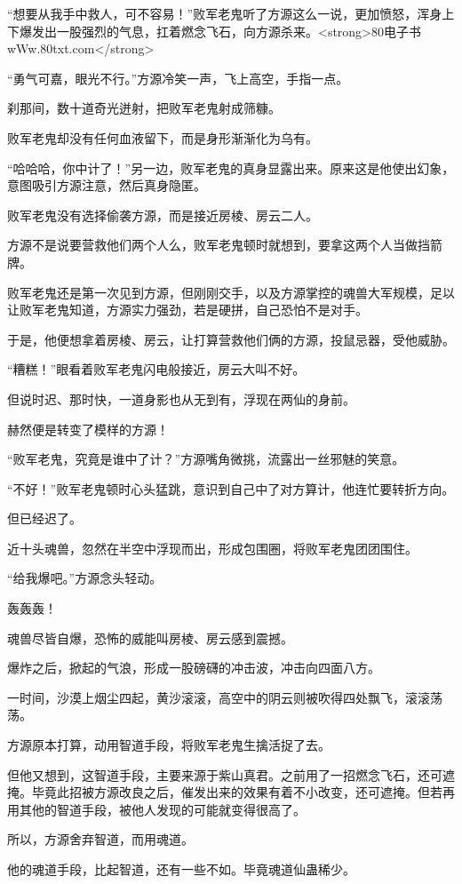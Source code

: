 \begin{this_body}
“想要从我手中救人，可不容易！”败军老鬼听了方源这么一说，更加愤怒，浑身上下爆发出一股强烈的气息，扛着燃念飞石，向方源杀来。<strong>80电子书wWw.80txt.com</strong>

“勇气可嘉，眼光不行。”方源冷笑一声，飞上高空，手指一点。

刹那间，数十道奇光迸射，把败军老鬼射成筛糠。

败军老鬼却没有任何血液留下，而是身形渐渐化为乌有。

“哈哈哈，你中计了！”另一边，败军老鬼的真身显露出来。原来这是他使出幻象，意图吸引方源注意，然后真身隐匿。

败军老鬼没有选择偷袭方源，而是接近房棱、房云二人。

方源不是说要营救他们两个人么，败军老鬼顿时就想到，要拿这两个人当做挡箭牌。

败军老鬼还是第一次见到方源，但刚刚交手，以及方源掌控的魂兽大军规模，足以让败军老鬼知道，方源实力强劲，若是硬拼，自己恐怕不是对手。

于是，他便想拿着房棱、房云，让打算营救他们俩的方源，投鼠忌器，受他威胁。

“糟糕！”眼看着败军老鬼闪电般接近，房云大叫不好。

但说时迟、那时快，一道身影也从无到有，浮现在两仙的身前。

赫然便是转变了模样的方源！

“败军老鬼，究竟是谁中了计？”方源嘴角微挑，流露出一丝邪魅的笑意。

“不好！”败军老鬼顿时心头猛跳，意识到自己中了对方算计，他连忙要转折方向。

但已经迟了。

近十头魂兽，忽然在半空中浮现而出，形成包围圈，将败军老鬼团团围住。

“给我爆吧。”方源念头轻动。

轰轰轰！

魂兽尽皆自爆，恐怖的威能叫房棱、房云感到震撼。

爆炸之后，掀起的气浪，形成一股磅礴的冲击波，冲击向四面八方。

一时间，沙漠上烟尘四起，黄沙滚滚，高空中的阴云则被吹得四处飘飞，滚滚荡荡。

方源原本打算，动用智道手段，将败军老鬼生擒活捉了去。

但他又想到，这智道手段，主要来源于紫山真君。之前用了一招燃念飞石，还可遮掩。毕竟此招被方源改良之后，催发出来的效果有着不小改变，还可遮掩。但若再用其他的智道手段，被他人发现的可能就变得很高了。

所以，方源舍弃智道，而用魂道。

他的魂道手段，比起智道，还有一些不如。毕竟魂道仙蛊稀少。


\end{this_body}

